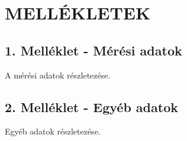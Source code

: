 \documentclass[a4paper,12pt]{article}
\begin{document}
	\newpage
	\appendix
	\section{MELLÉKLETEK}  %
	
	\subsection{1. Melléklet - Mérési adatok}  
	A mérési adatok részletezése.
	
	\subsection{2. Melléklet - Egyéb adatok}  
	Egyéb adatok részletezése.
	
	
\end{document}
